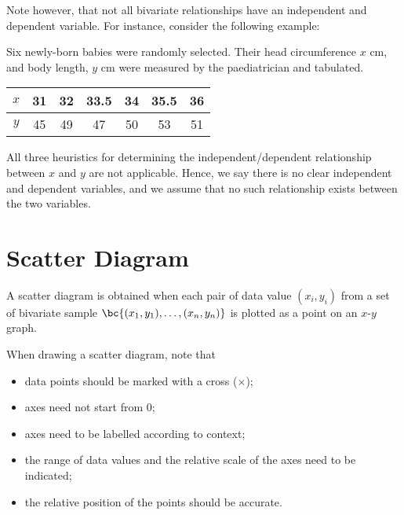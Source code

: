 Note however, that not all bivariate relationships have an independent and dependent variable. For instance, consider the following example:

\begin{example}
    Six newly-born babies were randomly selected. Their head circumference $x$ cm, and body length, $y$ cm were measured by the paediatrician and tabulated.

    \begin{table}[H]
        \centering
        \begin{tabular}{|c|c|c|c|c|c|c|}
        \hline
        $x$ & 31 & 32 & 33.5 & 34 & 35.5 & 36 \\ \hline
        $y$ & 45 & 49 & 47 & 50 & 53 & 51 \\ \hline
        \end{tabular}
    \end{table}

    All three heuristics for determining the independent/dependent relationship between $x$ and $y$ are not applicable. Hence, we say there is no clear independent and dependent variables, and we assume that no such relationship exists between the two variables.
\end{example}

\section{Scatter Diagram}

A scatter diagram is obtained when each pair of data value $(x_i, y_i)$ from a set of bivariate sample $\bc{(x_1, y_1), \dots, (x_n, y_n)}$ is plotted as a point on an $x$-$y$ graph.

\begin{recipe}
    When drawing a scatter diagram, note that
    \begin{itemize}
        \item data points should be marked with a cross ($\times$);
        \item axes need not start from 0;
        \item axes need to be labelled according to context;
        \item the range of data values and the relative scale of the axes need to be indicated;
        \item the relative position of the points should be accurate.
    \end{itemize}
\end{recipe}

